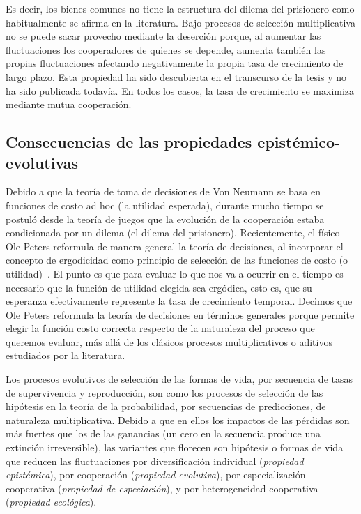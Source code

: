 \documentclass[a4paper,11pt]{book}
\theoremstyle{definition}
\begin{document}

Es decir, los bienes comunes no tiene la estructura del dilema del prisionero como habitualmente se afirma en la literatura.
%
Bajo procesos de selecci\'on multiplicativa no se puede sacar provecho mediante la deserci\'on porque, al aumentar las fluctuaciones los cooperadores de quienes se depende, aumenta tambi\'en las propias fluctuaciones afectando negativamente la propia tasa de crecimiento de largo plazo.
%
Esta propiedad ha sido descubierta en el transcurso de la tesis y no ha sido publicada todav\'ia.
%
En todos los casos, la tasa de crecimiento se maximiza mediante mutua cooperaci\'on.


\subsection{Consecuencias de las propiedades epist\'emico-evolutivas}

Debido a que la teor\'ia de toma de decisiones de Von Neumann se basa en funciones de costo ad hoc (la utilidad esperada), durante mucho tiempo se postul\'o desde la teor\'ia de juegos que la evoluci\'on de la cooperaci\'on estaba condicionada por un dilema (el dilema del prisionero).
%
Recientemente, el f\'isico Ole Peters reformula de manera general la teor\'ia de decisiones, al incorporar el concepto de ergodicidad como principio de selecci\'on de las funciones de costo (o utilidad)~\cite{peters2019-ergodicityEconomics,peters2021-interpretation}.
%
El punto es que para evaluar lo que nos va a ocurrir en el tiempo es necesario que la funci\'on de utilidad elegida sea erg\'odica, esto es, que su esperanza efectivamente represente la tasa de crecimiento temporal.
%
Decimos que Ole Peters reformula la teor\'ia de decisiones en t\'erminos generales porque permite elegir la funci\'on costo correcta respecto de la naturaleza del proceso que queremos evaluar, m\'as all\'a de los cl\'asicos procesos multiplicativos o aditivos estudiados por la literatura.


Los procesos evolutivos de selecci\'on de las formas de vida, por secuencia de tasas de supervivencia y reproducci\'on, son como los procesos de selecci\'on de las hip\'otesis en la teor\'ia de la probabilidad, por secuencias de predicciones, de naturaleza multiplicativa.
%
Debido a que en ellos los impactos de las p\'erdidas son m\'as fuertes que los de las ganancias (un cero en la secuencia produce una extinci\'on irreversible), las variantes que florecen son hip\'otesis o formas de vida que reducen las fluctuaciones por diversificaci\'on individual (\emph{propiedad epist\'emica}), por cooperaci\'on (\emph{propiedad evolutiva}), por especializaci\'on cooperativa (\emph{propiedad de especiaci\'on}), y por heterogeneidad cooperativa (\emph{propiedad ecol\'ogica}).
\end{document}
